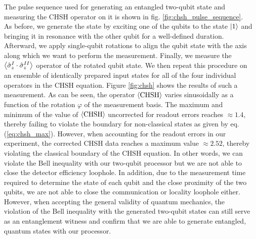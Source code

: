 The pulse sequence used for generating an entangled two-qubit state and measuring the CHSH operator on it is shown in fig. \ref{fig:chsh_pulse_sequence}. As before, we generate the state by exciting one of the qubits to the state $\left| 1 \right>$ and bringing it in resonance with the other qubit for a well-defined duration. Afterward, we apply single-qubit rotations to align the qubit state with the axis along which we want to perform the measurement. Finally, we measure the $\left< \hat{\sigma}_z^I\cdot \hat{\sigma}_z^{II} \right>$ operator of the rotated qubit state. We then repeat this procedure on an ensemble of identically prepared input states for all of the four individual operators in the CHSH equation. Figure \ref{fig:chsh} shows the results of such a measurement. As can be seen, the operator $\left< \mathrm{CHSH} \right>$ varies sinusoidally as a function of the rotation $\varphi$ of the measurement basis. The maximum and minimum of the value of $\left< \mathrm{CHSH} \right>$ uncorrected for readout errors reaches $\approx 1.4$, thereby failing to violate the boundary for non-classical states as given by eq. (\ref{eq:chsh_max}). However, when accounting for the readout errors in our experiment, the corrected CHSH data reaches a maximum value $\approx 2.52$, thereby violating the classical boundary of the CHSH equation. In other words, we can violate the Bell inequality with our two-qubit processor but we are not able to close the detector efficiency loophole. In addition, due to the measurement time required to determine the state of each qubit and the close proximity of the two qubits, we are not able to close the communication or locality loophole either. However, when accepting the general validity of quantum mechanics, the violation of the Bell inequality with the generated two-qubit states can still serve as an entanglement witness and confirm that we are able to generate entangled, quantum states with our processor.

